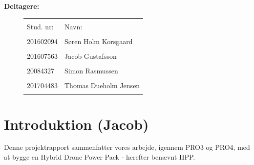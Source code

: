 \textbf{Deltagere:}
\begin{figure}[h]
  \centering
  \begin{tabular}{p{5cm}p{10cm}}
    &\\
    Stud. nr: & Navn: \\
    \hline
    &\\
    201602094 & Søren Holm Korsgaard \\
    &\\
    201607563 & Jacob Gustafsson \\
    &\\
    20084327 & Simon Rasmussen \\
    &\\
    201704483 & Thomas Dueholm Jensen \\
    &\\
    \hline
  \end{tabular}

\end{figure}
\vspace{-5mm}
\setcounter{tocdepth}{3}
\setcounter{secnumdepth}{4}
\clearpage
\renewcommand{\contentsname}{Table of Contents}
\tableofcontents
\newpage
\setcounter{page}{1}

\fancyhf{}
\fancyhead[LE,RO]{\leftmark}
\fancyhead[RE,LO]{\rightmark}

\chapter{Introduktion (Jacob)}
\label{sec:introduktion-1}

Denne projektrapport sammenfatter vores arbejde, igennem PRO3 og PRO4, med at bygge en Hybrid Drone Power Pack - herefter benævnt HPP.


